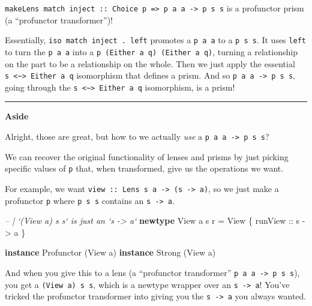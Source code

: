 \documentclass[]{article}
\newenvironment{Shaded}{}{}
\newcommand{\CommentTok}[1]{\textcolor[rgb]{0.38,0.63,0.69}{\textit{#1}}}
\newcommand{\DataTypeTok}[1]{\textcolor[rgb]{0.56,0.13,0.00}{#1}}
\newcommand{\FunctionTok}[1]{\textcolor[rgb]{0.02,0.16,0.49}{#1}}
\newcommand{\KeywordTok}[1]{\textcolor[rgb]{0.00,0.44,0.13}{\textbf{#1}}}
\newcommand{\NormalTok}[1]{#1}
\newcommand{\OtherTok}[1]{\textcolor[rgb]{0.00,0.44,0.13}{#1}}
\begin{document}
\texttt{makeLens\ match\ inject\ ::\ Choice\ p\ =\textgreater{}\ p\ a\ a\ -\textgreater{}\ p\ s\ s}
is a profunctor prism (a ``profunctor transformer'')!

Essentially, \texttt{iso\ match\ inject\ .\ left\textquotesingle{}} promotes a
\texttt{p\ a\ a} to a \texttt{p\ s\ s}. It uses \texttt{left\textquotesingle{}}
to turn the \texttt{p\ a\ a} into a \texttt{p\ (Either\ a\ q)\ (Either\ a\ q)},
turning a relationship on the part to be a relationship on the whole. Then we
just apply the essential
\texttt{s\ \textless{}\textasciitilde{}\textgreater{}\ Either\ a\ q} isomorphism
that defines a prism. And so \texttt{p\ a\ a\ -\textgreater{}\ p\ s\ s}, going
through the \texttt{s\ \textless{}\textasciitilde{}\textgreater{}\ Either\ a\ q}
isomorphism, is a prism!

\begin{center}\rule{0.5\linewidth}{\linethickness}\end{center}

\textbf{Aside}

Alright, those are great, but how to we actually \emph{use} a
\texttt{p\ a\ a\ -\textgreater{}\ p\ s\ s}?

We can recover the original functionality of lenses and prisms by just picking
specific values of \texttt{p} that, when transformed, give us the operations we
want.

For example, we want
\texttt{view\ ::\ Lens\textquotesingle{}\ s\ a\ -\textgreater{}\ (s\ -\textgreater{}\ a)},
so we just make a profunctor \texttt{p} where \texttt{p\ s\ s} contains an
\texttt{s\ -\textgreater{}\ a}.

\begin{Shaded}
\begin{Highlighting}[]
\CommentTok{-- | `(View a) s s` is just an `s -> a`}
\KeywordTok{newtype} \DataTypeTok{View}\NormalTok{ a s r }\FunctionTok{=} \DataTypeTok{View}\NormalTok{ \{}\OtherTok{ runView ::}\NormalTok{ s }\OtherTok{->}\NormalTok{ a \}}

\KeywordTok{instance} \DataTypeTok{Profunctor}\NormalTok{ (}\DataTypeTok{View}\NormalTok{ a)}
\KeywordTok{instance} \DataTypeTok{Strong}\NormalTok{ (}\DataTypeTok{View}\NormalTok{ a)}
\end{Highlighting}
\end{Shaded}

And when you give this to a lens (a ``profunctor transformer''
\texttt{p\ a\ a\ -\textgreater{}\ p\ s\ s}), you get a \texttt{(View\ a)\ s\ s},
which is a newtype wrapper over an \texttt{s\ -\textgreater{}\ a}! You've
tricked the profunctor transformer into giving you the
\texttt{s\ -\textgreater{}\ a} you always wanted.
\end{document}
